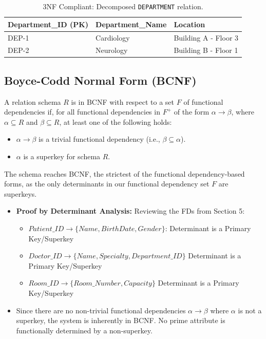 \documentclass[12pt,a4paper]{article}
\begin{document}
\begin{table}[h]
	\centering
	\begin{tabular}{lll}
		\toprule
		\textbf{Department\_ID (PK)} & \textbf{Department\_Name} & \textbf{Location}    \\
		\midrule
		DEP-1                        & Cardiology                & Building A - Floor 3 \\
		DEP-2                        & Neurology                 & Building B - Floor 1 \\
		\bottomrule
	\end{tabular}
	\caption{3NF Compliant: Decomposed \texttt{DEPARTMENT} relation.}
\end{table}

\subsection{Boyce-Codd Normal Form (BCNF)}
A relation schema $R$ is in BCNF with respect to a set $F$ of functional dependencies if, for all functional dependencies in $F^+$ of the form $\alpha \rightarrow \beta$, where $\alpha \subseteq R$ and $\beta \subseteq R$, at least one of the following holds:

\begin{itemize}[label=\textbf{--}]
	\item $\alpha \rightarrow \beta$ is a trivial functional dependency (i.e., $\beta \subseteq \alpha$).
	\item $\alpha$ is a superkey for schema $R$.
\end{itemize}

The schema reaches BCNF, the strictest of the functional dependency-based forms, as the only determinants in our functional dependency set $F$ are superkeys.
\begin{itemize}[label=$\bullet$]
	\item \textbf{Proof by Determinant Analysis:} Reviewing the FDs from Section 5:
	      \begin{itemize}
		      \item $Patient\_ID \rightarrow \{Name, BirthDate, Gender\}$: Determinant is a Primary Key/Superkey
		      \item $Doctor\_ID \rightarrow \{Name, Specialty, Department\_ID\}$ Determinant is a Primary Key/Superkey
		      \item $Room\_ID \rightarrow \{Room\_Number, Capacity\}$ Determinant is a Primary Key/Superkey
	      \end{itemize}
	\item Since there are no non-trivial functional dependencies $\alpha \rightarrow \beta$ where $\alpha$ is not a superkey, the system is inherently in BCNF. No prime attribute is functionally determined by a non-superkey.
\end{itemize}
\end{document}
